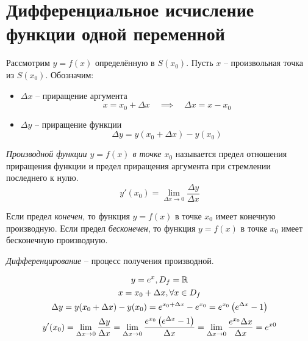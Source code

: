 \section{Дифференциальное исчисление функции одной переменной}

Рассмотрим $y=f(x)$ определённую в $S(x_0)$. Пусть $x$ -- произвольная точка из $S(x_0)$.
Обозначим:
\begin{itemize}
  \item $\Delta x$ -- приращение аргумента \[
    x = x_0 + \Delta x \quad \implies \quad \Delta x = x - x_0
  \]
  \item $\Delta y$ -- приращение функции \[
    \Delta y = y(x_0 + \Delta x) - y(x_0)
  \] 
\end{itemize}

\begin{definition}
  \textit{Производной функции $y = f(x)$ в точке $x_0$ } называется предел отношения приращения функции и предел приращения аргумента при стремлении последнего к нулю. \[
  y'(x_0) = \lim_{\Delta x \to 0} \frac{\Delta y}{\Delta x}
  \] 
\end{definition}

Если предел \textit{конечен}, то функция $y=f(x)$ в точке $x_0$ имеет конечную производную.
Если предел \textit{бесконечен}, то функция $y=f(x)$ в точке $x_0$ имеет бесконечную производную.

\textit{Дифференцирование} -- процесс получения производной.

\begin{eg}
  \begin{gather*}
    y = e^x, D_f = \mathbb{R} \\
    x = x_0 + \Delta x, \forall x \in D_f \\
\Delta  y = y(x_0 + \Delta x) - y(x_0) = e^{x_0 + \Delta x} - e^{x_0} = e^{x_0} \left(e^{\Delta x} - 1\right) \\
y'(x_0) = \lim_{\Delta x \to 0} \frac{\Delta y}{\Delta x} = \lim_{\Delta x \to 0} \frac{e^{x_0} \left( e^{\Delta x} - 1 \right) }{\Delta x} = \lim_{\Delta x \to 0} \frac{e^{x_0} \Delta x}{\Delta x} = e^{x0}
  \end{gather*}
\end{eg}

\pagebreak

